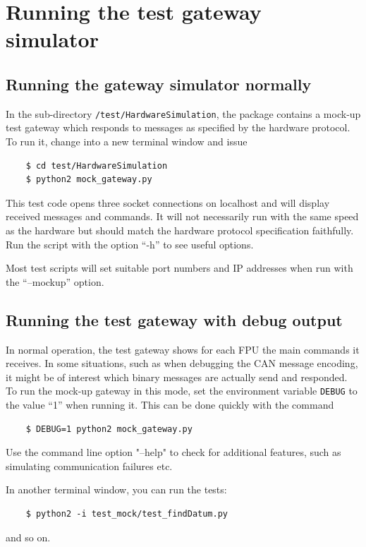 \documentclass[fontsize=12,a4paper]{scrreprt}
\begin{document}
\chapter{Running the test gateway simulator}
\label{sec:runningthegateway}
\section{Running the gateway simulator normally}
In the sub-directory \texttt{/test/HardwareSimulation}, the package
contains a mock-up test gateway which responds to messages as
specified by the hardware protocol. To run it, change into a new
terminal window and issue

  \begin{verbatim}
    $ cd test/HardwareSimulation
    $ python2 mock_gateway.py
  \end{verbatim}


This test code opens three socket connections on localhost and will
display received messages and commands. It will not necessarily run
with the same speed as the hardware but should match the hardware
protocol specification faithfully. Run the script with the option
``-h'' to see useful options.

Most test scripts will set suitable port numbers and IP addresses when
run with the ``--mockup'' option.

\section{Running the test gateway with debug output}

In normal operation, the test gateway shows for each FPU the main
commands it receives. In some situations, such as when debugging the
CAN message encoding, it might be of interest which binary messages
are actually send and responded. To run the mock-up gateway in this
mode, set the environment variable \texttt{DEBUG} to the value ``1''
when running it. This can be done quickly with the command

  \begin{verbatim}
    $ DEBUG=1 python2 mock_gateway.py
  \end{verbatim}



Use the command line option "--help" to check for additional features,
such as simulating communication failures etc.

In another terminal window, you can run the tests:
  \begin{verbatim}
    $ python2 -i test_mock/test_findDatum.py
  \end{verbatim}
and so on.
\end{document}
